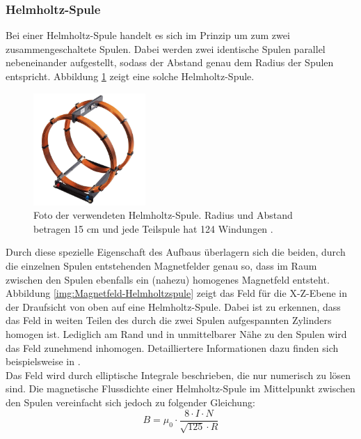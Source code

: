 \subsubsection{Helmholtz-Spule}
\label{sec-2-3-3}
Bei einer Helmholtz-Spule handelt es sich im Prinzip um zum zwei zusammengeschaltete Spulen. Dabei werden zwei identische Spulen parallel nebeneinander aufgestellt, sodass der Abstand genau dem Radius der Spulen entspricht. Abbildung \ref{img:Helmholtz} zeigt eine solche Helmholtz-Spule.\\
\begin{figure}
	\centering
	\includegraphics[width=0.38\textwidth]{images/papers/Helmholtz.jpg}
	\caption{Foto der verwendeten Helmholtz-Spule. Radius und Abstand betragen 15 cm und jede Teilspule hat 124 Windungen \cite{3BS}.}
	\label{img:Helmholtz}
\end{figure}


Durch diese spezielle Eigenschaft des Aufbaus überlagern sich die beiden, durch die einzelnen Spulen entstehenden Magnetfelder genau so, dass im Raum zwischen den Spulen ebenfalls ein (nahezu) homogenes Magnetfeld entsteht. Abbildung \ref{img:Magnetfeld-Helmholtzspule} zeigt das Feld für die X-Z-Ebene in der Draufsicht von oben auf eine Helmholtz-Spule. Dabei ist zu erkennen, dass das Feld in weiten Teilen des durch die zwei Spulen aufgespannten Zylinders homogen ist. Lediglich am Rand und in unmittelbarer Nähe zu den Spulen wird das Feld zunehmend inhomogen. Detailliertere Informationen dazu finden sich beispielsweise in \cite{Demtroder13}.\\

Das Feld wird durch elliptische Integrale beschrieben, die nur numerisch zu lösen sind.
Die magnetische Flussdichte einer Helmholtz-Spule im Mittelpunkt zwischen den Spulen vereinfacht sich jedoch zu folgender Gleichung:
\begin{equation}
\label{eq:mfield}
B = \mu_{0} \cdot \frac{8 \cdot I \cdot N}{\sqrt{125} \cdot R}
\end{equation}

